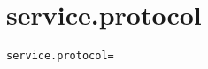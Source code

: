 \section{service.protocol}
\label{configuration:ServiceProtocol}
\AvailableInCsharpOnly{\TODO}
\begin{lstlisting}[style=Props,caption={Usage example for \textit{service.protocol}}]
service.protocol=
\end{lstlisting}